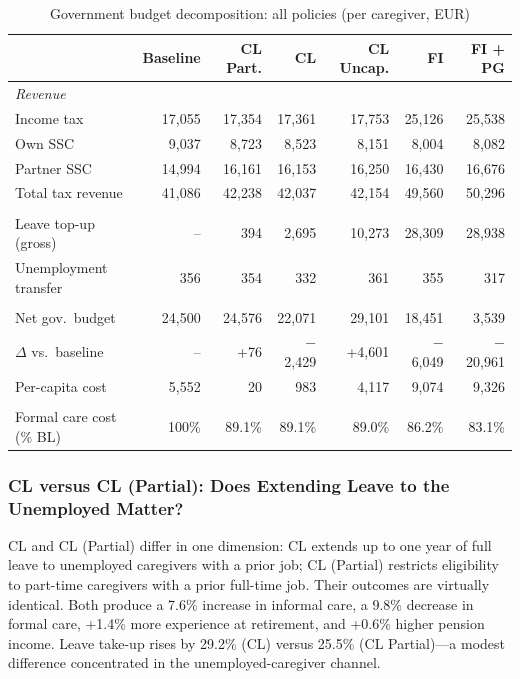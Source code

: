 \begin{table}[htbp]
  \centering
  \caption{Government budget decomposition: all policies (per caregiver, EUR)}
  \label{tab:fiscal_all_policies}
  \footnotesize
  \begin{tabular}{lrrrrrr}
    \toprule
    & Baseline & CL Part. & CL & CL Uncap. & FI & FI + PG \\
    \midrule
    \multicolumn{7}{l}{\textit{Revenue}} \\
    Income tax & 17,055 & 17,354 & 17,361 & 17,753 & 25,126 & 25,538 \\
    Own SSC & 9,037 & 8,723 & 8,523 & 8,151 & 8,004 & 8,082 \\
    Partner SSC & 14,994 & 16,161 & 16,153 & 16,250 & 16,430 & 16,676 \\
    Total tax revenue & 41,086 & 42,238 & 42,037 & 42,154 & 49,560 & 50,296 \\
    \addlinespace
    \multicolumn{7}{l}{\textit{Expenditure}} \\
    Leave top-up (gross) & -- & 394 & 2,695 & 10,273 & 28,309 & 28,938 \\
    Unemployment transfer & 356 & 354 & 332 & 361 & 355 & 317 \\
    \addlinespace
    \multicolumn{7}{l}{\textit{Net budget}} \\
    Net gov.\ budget & 24,500 & 24,576 & 22,071 & 29,101 & 18,451 & 3,539 \\
    $\Delta$ vs.\ baseline & -- & +76 & $-$2,429 & +4,601 & $-$6,049 & $-$20,961 \\
    Per-capita cost & 5,552 & 20 & 983 & 4,117 & 9,074 & 9,326 \\
    \addlinespace
    \multicolumn{7}{l}{\textit{Formal care (total EUR M)}} \\
    Formal care cost (\% BL) & 100\% & 89.1\% & 89.1\% & 89.0\% & 86.2\% & 83.1\% \\
    \bottomrule
  \end{tabular}
\end{table}

\subsubsection{CL versus CL (Partial): Does Extending Leave to the Unemployed Matter?}

CL and CL (Partial) differ in one dimension: CL extends up to one year of full leave to unemployed caregivers with a prior job; CL (Partial) restricts eligibility to part-time caregivers with a prior full-time job. Their outcomes are virtually identical. Both produce a 7.6\% increase in informal care, a 9.8\% decrease in formal care, +1.4\% more experience at retirement, and +0.6\% higher pension income. Leave take-up rises by 29.2\% (CL) versus 25.5\% (CL Partial)---a modest difference concentrated in the unemployed-caregiver channel.

